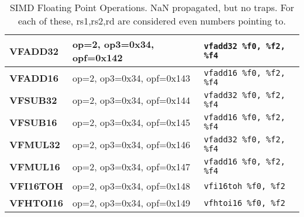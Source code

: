 \begin{table}[p]
  \centering
  \begin{tabular}[p]{|l|l|l|}
    \hline
    \textbf{VFADD32}
    & {op=2, op3=0x34, opf=0x142}
    & \texttt{vfadd32 \%f0, \%f2, \%f4} \\
    \hline
    \textbf{VFADD16}
    & {op=2, op3=0x34, opf=0x143}
    & \texttt{vfadd16 \%f0, \%f2, \%f4} \\
    \hline
    \textbf{VFSUB32}
    & {op=2, op3=0x34, opf=0x144}
    & \texttt{vfadd32 \%f0, \%f2, \%f4} \\
    \hline
    \textbf{VFSUB16}
    & {op=2, op3=0x34, opf=0x145}
    & \texttt{vfadd16 \%f0, \%f2, \%f4} \\
    \hline
    \textbf{VFMUL32}
    & {op=2, op3=0x34, opf=0x146}
    & \texttt{vfadd32 \%f0, \%f2, \%f4} \\
    \hline
    \textbf{VFMUL16}
    & {op=2, op3=0x34, opf=0x147}
    & \texttt{vfadd16 \%f0, \%f2, \%f4} \\
    \hline
    \textbf{VFI16TOH}
    & {op=2, op3=0x34, opf=0x148}
    & \texttt{vfi16toh \%f0, \%f2} \\
    \hline
    \textbf{VFHTOI16}
    & {op=2, op3=0x34, opf=0x149}
    & \texttt{vfhtoi16 \%f0, \%f2} \\
    \hline      
  \end{tabular}
  \caption[SIMD Floating Point Operations]{SIMD Floating Point
    Operations.  NaN propagated, but no traps. For each of these,
    rs1,rs2,rd are considered even numbers pointing to.
  }
  \label{tab:simd:float:ops}
\end{table}


